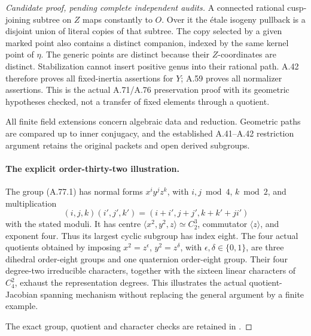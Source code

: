 \begin{proof}[Candidate proof, pending complete independent audits]
A connected rational cusp-joining subtree on \(Z\)
maps constantly to \(O\). Over it the \'{e}tale
isogeny pullback is a disjoint union of literal copies
of that subtree. The copy selected by a given marked
point also contains a distinct companion, indexed by
the same kernel point of \(\eta\). The generic
points are distinct because their \(Z\)-coordinates
are distinct. Stabilization cannot insert positive
genus into their rational path. A.42 therefore proves
all fixed-inertia assertions for \(Y\); A.59 proves
all normalizer assertions. This is the actual A.71/A.76
preservation proof with its geometric hypotheses checked,
not a transfer of fixed elements through a quotient.

All finite field extensions concern algebraic data and
reduction. Geometric paths are compared up to inner
conjugacy, and the established A.41--A.42 restriction
argument retains the original packets and open derived
subgroups.

\paragraph{The explicit order-thirty-two illustration.}
The group (A.77.1) has normal forms
\(x^i y^j z^k\), with \(i,j\bmod4\), \(k\bmod2\),
and multiplication
\[
 (i,j,k)(i',j',k')=(i+i',j+j',k+k'+ji')
                                                        \tag{A.77.10}
\]
with the stated moduli. It has centre
\(\langle x^2,y^2,z\rangle\simeq C_2^3\), commutator
\(\langle z\rangle\), and exponent four. Thus its
largest cyclic subgroup has index eight. The four
actual quotients obtained by imposing
\(x^2=z^\epsilon\), \(y^2=z^\delta\), with
\(\epsilon,\delta\in\{0,1\}\), are three dihedral
order-eight groups and one quaternion order-eight group.
Their four degree-two irreducible characters, together
with the sixteen linear characters of \(C_4^2\),
exhaust the representation degrees. This illustrates
the actual quotient-Jacobian spanning mechanism without
replacing the general argument by a finite example.

The exact group, quotient and character checks are
retained in .
\end{proof}
